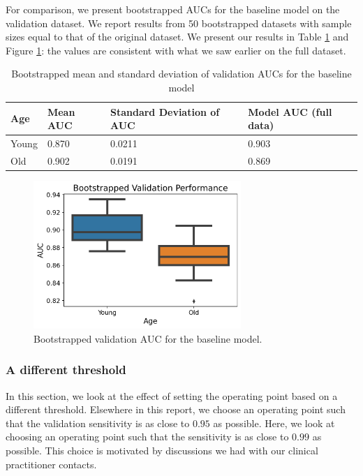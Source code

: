 \documentclass[11pt, letterpaper]{amsart}
\let\Oldsubsubsection\subsubsection
\renewcommand{\subsubsection}{\FloatBarrier\Oldsubsubsection}
\begin{document}
For comparison, we present bootstrapped AUCs for the baseline model on the validation dataset. We report results from 50 bootstrapped datasets with sample sizes equal to that of the original dataset. We present our results in Table \ref{tab:bs_auc_baseline} and Figure \ref{fig:baseline_bootstrap_val}: the values are consistent with what we saw earlier on the full dataset. 
\begin{table}[h]
\begin{tabular}{llll}
Age & Mean AUC & Standard Deviation of AUC & Model AUC (full data) \\
\hline
Young & 0.870 & 0.0211 & 0.903 \\
Old & 0.902 & 0.0191 & 0.869 
\end{tabular}
\caption{Bootstrapped mean and standard deviation of validation AUCs for the baseline model}\label{tab:bs_auc_baseline}
\end{table}
\begin{figure}
	\centering
	\includegraphics[width=0.7\textwidth]{baseline_bootstrap_val.png}
	\caption{Bootstrapped validation AUC for the baseline model.}\label{fig:baseline_bootstrap_val}
\end{figure}

\subsubsection{A different threshold}

In this section, we look at the effect of setting the operating point based on a different threshold. Elsewhere in this report, we choose an operating point such that the validation sensitivity is as close to $0.95$ as possible. Here, we look at choosing an operating point such that the sensitivity is as close to $0.99$ as possible. This choice is motivated by discussions we had with our clinical practitioner contacts. 
\end{document}
